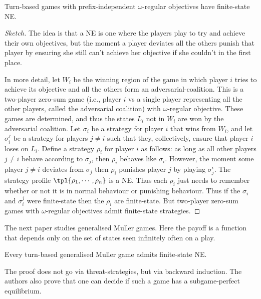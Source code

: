 \begin{theorem}
Turn-based games with prefix-independent $\omega$-regular objectives have
finite-state NE. 
\end{theorem}
\begin{proof}[Sketch] 
The idea is that a NE is one where the players play to try and achieve their 
own 
objectives, but the moment a player deviates all the others punish that player 
by ensuring she still can't achieve her objective if she couldn't in the first 
place.

In more detail, let $W_i$ be the 
winning region of the game in which player $i$ tries to achieve its objective 
and all the others form an adversarial-coalition. This is a two-player zero-sum 
game (i.e., player $i$ vs a single player representing all the other players, 
called the adversarial coalition) with $\omega$-regular objective. These games 
are determined, and thus the states $L_i$ not in $W_i$ are won by the 
adversarial coalition. Let $\sigma_i$ be a strategy for player $i$ that wins 
from $W_i$, and let $\sigma_i^j$ be a strategy for players $j \neq i$ such that 
they, collectively, ensure that player $i$ loses on $L_i$. Define a strategy 
$\rho_i$ for player $i$ as follows: as long as all other players $j \neq i$ 
behave according to $\sigma_j$, then $\rho_i$ behaves like $\sigma_i$. However, 
the moment some player $j \neq i$ deviates from $\sigma_j$ then $\rho_i$ 
punishes player $j$ by playing $\sigma_j^i$. The strategy profile $\tpl{\rho_1, 
\cdots, \rho_n}$ is a NE.
Thus each $\rho_i$
just needs to remember whether or not it is in normal behaviour or punishing 
behaviour. Thus if the $\sigma_i$ and $\sigma_i^j$ were finite-state 
then the $\rho_i$ are finite-state.
But two-player zero-sum games with $\omega$-regular objectives admit finite-state strategies.
\end{proof}

The next paper studies generalised Muller games. Here the payoff is a function that depends only on the set of states seen infinitely often on a play. 
\begin{theorem}
Every turn-based generalised Muller game admits finite-state NE.
\end{theorem}
The proof does not go via threat-strategies, but via backward induction. The 
authors also prove that one can decide if such a game has a subgame-perfect 
equilibrium.

